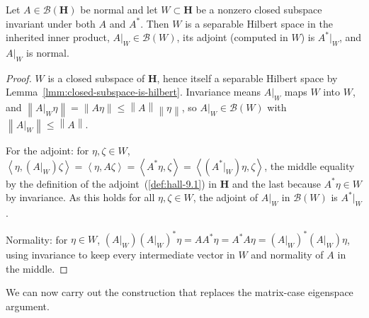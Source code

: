 \begin{lemma}
    \label{lmm:restriction-of-normal-operator}
    \leanok
    Let $A \in \mathcal{B}(\mathbf{H})$ be normal and let $W \subset \mathbf{H}$ be a nonzero closed subspace invariant under both $A$ and $A^*$. Then $W$ is a separable Hilbert space in the inherited inner product, $A\vert_W \in \mathcal{B}(W)$, its adjoint (computed in $W$) is $A^*\vert_W$, and $A\vert_W$ is normal.
\end{lemma}
\begin{proof}
    \leanok
$W$ is a closed subspace of $\mathbf{H}$, hence itself a separable Hilbert space by Lemma~\ref{lmm:closed-subspace-is-hilbert}. Invariance means $A\vert_W$ maps $W$ into $W$, and $\left\| A\vert_W\eta \right\| = \left\| A\eta \right\| \le \left\| A \right\|\left\| \eta \right\|$, so $A\vert_W \in \mathcal{B}(W)$ with $\left\| A\vert_W \right\| \le \left\| A \right\|$.

For the adjoint: for $\eta,\zeta \in W$, $\left< \eta, (A\vert_W)\zeta \right> = \left< \eta, A\zeta \right> = \left< A^*\eta, \zeta \right> = \left< (A^*\vert_W)\eta, \zeta \right>$, the middle equality by the definition of the adjoint~(\ref{def:hall-9.1}) in $\mathbf{H}$ and the last because $A^*\eta \in W$ by invariance. As this holds for all $\eta,\zeta \in W$, the adjoint of $A\vert_W$ in $\mathcal{B}(W)$ is $A^*\vert_W$.

Normality: for $\eta \in W$, $(A\vert_W)(A\vert_W)^*\eta = A A^*\eta = A^*A\eta = (A\vert_W)^*(A\vert_W)\eta$, using invariance to keep every intermediate vector in $W$ and normality of $A$ in the middle.
\end{proof}

We can now carry out the construction that replaces the matrix-case eigenspace argument.

